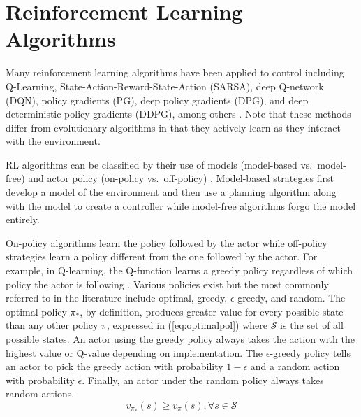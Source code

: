 \section{Reinforcement Learning Algorithms}
Many reinforcement learning algorithms have been applied to control including Q-Learning, State-Action-Reward-State-Action (SARSA), deep Q-network (DQN), policy gradients (PG), deep policy gradients (DPG), and deep deterministic policy gradients (DDPG), among others \cite{sutton_2017}\cite{sutton_policygrad}\cite{silver_2017}\cite{silver_lever_heess_degris_wierstra_riedmiller}\cite{lillicrap_2016}. Note that these methods differ from evolutionary algorithms in that they actively learn as they interact with the environment.

RL algorithms can be classified by their use of models (model-based vs.\ model-free) and actor policy (on-policy vs.\ off-policy) \cite{sutton_2017}. Model-based strategies first develop a model of the environment and then use a planning algorithm along with the model to create a controller while model-free algorithms forgo the model entirely.

On-policy algorithms learn the policy followed by the actor while off-policy strategies learn a policy different from the one followed by the actor. For example, in Q-learning, the Q-function learns a greedy policy regardless of which policy the actor is following \cite{sutton_2017}. Various policies exist but the most commonly referred to in the literature include optimal, greedy, $\epsilon$-greedy, and random. The optimal policy $\pi_*$, by definition, produces greater value for every possible state than any other policy $\pi$, expressed in (\ref{eq:optimalpol}) where $\mathcal{S}$ is the set of all possible states. An actor using the greedy policy always takes the action with the highest value or Q-value depending on implementation. The $\epsilon$-greedy policy tells an actor to pick the greedy action with probability $1-\epsilon$ and a random action with probability $\epsilon$. Finally, an actor under the random policy always takes random actions.
\begin{equation}
	\label{eq:optimalpol}
v_{\pi_*}(s) \geq v_{\pi}(s), \forall s \in \mathcal{S}
\end{equation}

